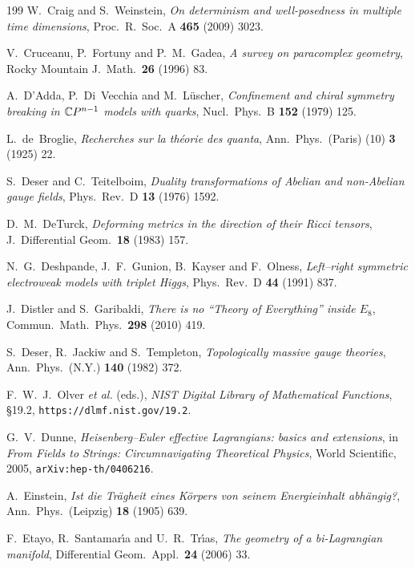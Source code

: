 \begin{thebibliography}{199}
 W.~Craig and S.~Weinstein, \emph{On determinism and well-posedness in multiple time dimensions}, Proc.~R.~Soc.~A \textbf{465} (2009) 3023.

 V.~Cruceanu, P.~Fortuny and P.~M.~Gadea, \emph{A survey on paracomplex geometry}, Rocky Mountain J.~Math.~\textbf{26} (1996) 83.

 A.~D'Adda, P.~Di~Vecchia and M.~L\"uscher, \emph{Confinement and chiral symmetry breaking in $\mathbb{C} P^{n-1}$ models with quarks},
Nucl.~Phys.~B \textbf{152} (1979) 125.

 L.~de~Broglie, \emph{Recherches sur la th\'eorie des quanta}, Ann.~Phys.~(Paris) (10) \textbf{3} (1925) 22.

 S.~Deser and C.~Teitelboim, \emph{Duality transformations of Abelian and non-Abelian gauge fields}, Phys.~Rev.~D \textbf{13} (1976) 1592.

 D.~M.~DeTurck, \emph{Deforming metrics in the direction of their Ricci tensors}, J.~Differential Geom.~\textbf{18} (1983) 157.

 N.~G.~Deshpande, J.~F.~Gunion, B.~Kayser and F.~Olness, \emph{Left--right symmetric electroweak models with triplet Higgs}, Phys.~Rev.~D \textbf{44}
(1991) 837.

 J.~Distler and S.~Garibaldi, \emph{There is no ``Theory of Everything'' inside $E_8$}, Commun.~Math.~Phys.~\textbf{298} (2010) 419.

 S.~Deser, R.~Jackiw and S.~Templeton, \emph{Topologically massive gauge theories}, Ann.~Phys.~(N.Y.) \textbf{140} (1982) 372.

 F.~W.~J.~Olver \emph{et al.} (eds.), \emph{NIST Digital Library of Mathematical Functions}, \S19.2, \texttt{https://dlmf.nist.gov/19.2}.

 G.~V.~Dunne, \emph{Heisenberg--Euler effective Lagrangians: basics and extensions}, in \emph{From Fields to Strings: Circumnavigating Theoretical Physics},
World Scientific, 2005, \texttt{arXiv:hep-th/0406216}.

 A.~Einstein, \emph{Ist die Tr\"agheit eines K\"orpers von seinem Energieinhalt abh\"angig?}, Ann.~Phys.~(Leipzig) \textbf{18} (1905) 639.

 F.~Etayo, R.~Santamar\'{\i}a and U.~R.~Tr\'{\i}as, \emph{The geometry of a bi-Lagrangian manifold}, Differential Geom.~Appl.~\textbf{24} (2006) 33.


\end{thebibliography}

